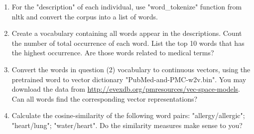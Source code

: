 \documentclass{article}
\begin{document}
\begin{enumerate}[(1)]
	\item For the "description" of each individual, use "word\_tokenize" function from nltk and convert the corpus into a list of words.
	\item Create a vocabulary containing all words appear in the descriptions. Count the number of total occurrence of each word. List the top 10 words that has the highest occurrence. Are those words related to medical terms?
	\item Convert the words in question (2) vocabulary to continuous vectors, using the pretrained word to vector dictionary "PubMed-and-PMC-w2v.bin". You may download the data from \url{http://evexdb.org/pmresources/vec-space-models}. Can all words find the corresponding vector representations?
	\item Calculate the cosine-similarity of the following word pairs: "allergy/allergic"; "heart/lung"; "water/heart". Do the similarity measures make sense to you?
\end{enumerate}
\end{document}
